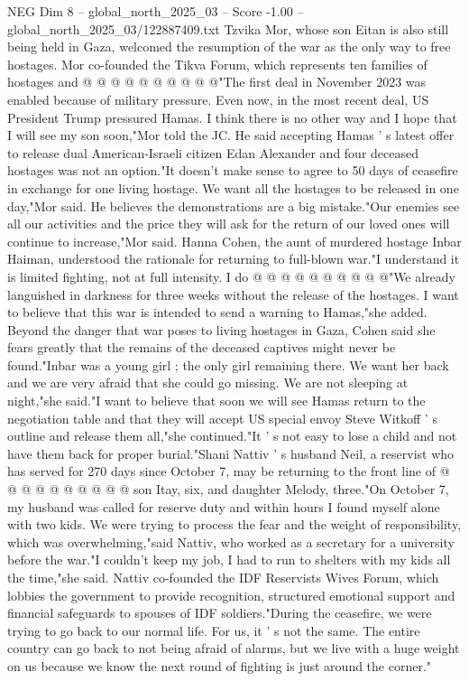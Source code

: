 \begin{textsample}{NEG Dim 8 – global\_north\_2025\_03 – Score -1.00 – global\_north\_2025\_03/122887409.txt}
Tzvika Mor, whose son Eitan is also still being held in Gaza, welcomed the resumption of the war as the only way to free hostages.
Mor co-founded the Tikva Forum, which represents ten families of hostages and @ @ @ @ @ @ @ @ @ @"The first deal in November 2023 was enabled because of military pressure.
Even now, in the most recent deal, US President Trump pressured Hamas.
I think there is no other way and I hope that I will see my son soon,"Mor told the JC.
He said accepting Hamas ' s latest offer to release dual American-Israeli citizen Edan Alexander and four deceased hostages was not an option."It doesn't make sense to agree to 50 days of ceasefire in exchange for one living hostage.
We want all the hostages to be released in one day,"Mor said.
He believes the demonstrations are a big mistake."Our enemies see all our activities and the price they will ask for the return of our loved ones will continue to increase,"Mor said.
Hanna Cohen, the aunt of murdered hostage Inbar Haiman, understood the rationale for returning to full-blown war."I understand it is limited fighting, not at full intensity.
I do @ @ @ @ @ @ @ @ @ @"We already languished in darkness for three weeks without the release of the hostages.
I want to believe that this war is intended to send a warning to Hamas,"she added.
Beyond the danger that war poses to living hostages in Gaza, Cohen said she fears greatly that the remains of the deceased captives might never be found."Inbar was a young girl ; the only girl remaining there.
We want her back and we are very afraid that she could go missing.
We are not sleeping at night,"she said."I want to believe that soon we will see Hamas return to the negotiation table and that they will accept US special envoy Steve Witkoff ' s outline and release them all,"she continued."It ' s not easy to lose a child and not have them back for proper burial."Shani Nattiv ' s husband Neil, a reservist who has served for 270 days since October 7, may be returning to the front line of @ @ @ @ @ @ @ @ @ @ son Itay, six, and daughter Melody, three."On October 7, my husband was called for reserve duty and within hours I found myself alone with two kids.
We were trying to process the fear and the weight of responsibility, which was overwhelming,"said Nattiv, who worked as a secretary for a university before the war."I couldn't keep my job, I had to run to shelters with my kids all the time,"she said.
Nattiv co-founded the IDF Reservists Wives Forum, which lobbies the government to provide recognition, structured emotional support and financial safeguards to spouses of IDF soldiers."During the ceasefire, we were trying to go back to our normal life.
For us, it ' s not the same.
The entire country can go back to not being afraid of alarms, but we live with a huge weight on us because we know the next round of fighting is just around the corner."

\end{textsample}
